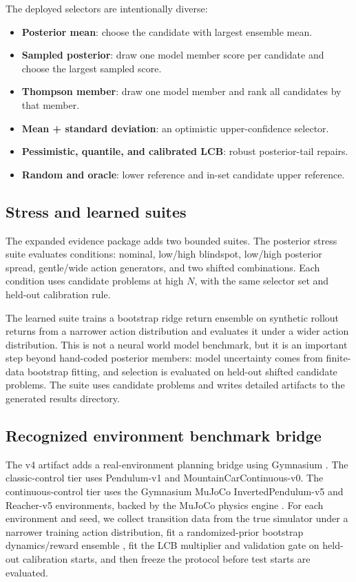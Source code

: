 \documentclass{article}
\begin{document}
The deployed selectors are intentionally diverse:
\begin{itemize}
    \item \textbf{Posterior mean}: choose the candidate with largest ensemble
    mean.
    \item \textbf{Sampled posterior}: draw one model member score per
    candidate and choose the largest sampled score.
    \item \textbf{Thompson member}: draw one model member and rank all
    candidates by that member.
    \item \textbf{Mean + standard deviation}: an optimistic upper-confidence
    selector.
    \item \textbf{Pessimistic, quantile, and calibrated LCB}: robust
    posterior-tail repairs.
    \item \textbf{Random and oracle}: lower reference and in-set candidate
    upper reference.
\end{itemize}

\subsection{Stress and learned suites}

The expanded evidence package adds two bounded suites. The posterior stress suite evaluates
\VThreeStressConditions{} conditions: nominal, low/high blindspot, low/high
posterior spread, gentle/wide action generators, and two shifted combinations.
Each condition uses \VThreeStressReplicates{} candidate problems at high $N$,
with the same selector set and held-out calibration rule.

The learned suite trains a bootstrap ridge return ensemble on synthetic
rollout returns from a narrower action distribution and evaluates it under a
wider action distribution. This is not a neural world model benchmark, but it
is an important step beyond hand-coded posterior members: model uncertainty
comes from finite-data bootstrap fitting, and selection is evaluated on
held-out shifted candidate problems. The suite uses \VThreeLearnedProblems{}
candidate problems and writes detailed artifacts to the generated results
directory.

\subsection{Recognized environment benchmark bridge}

The v4 artifact adds a real-environment planning bridge using Gymnasium
\citep{towers2024gymnasium}. The classic-control tier uses Pendulum-v1 and
MountainCarContinuous-v0. The continuous-control tier uses the Gymnasium
MuJoCo InvertedPendulum-v5 and Reacher-v5 environments, backed by the MuJoCo
physics engine \citep{todorov2012mujoco}. For each environment and seed, we
collect transition data from the true simulator under a narrower training
action distribution, fit a randomized-prior bootstrap dynamics/reward ensemble
\citep{osband2018randomized}, fit the LCB multiplier and validation gate on
held-out calibration starts, and then freeze the protocol before test starts
are evaluated.
\end{document}
